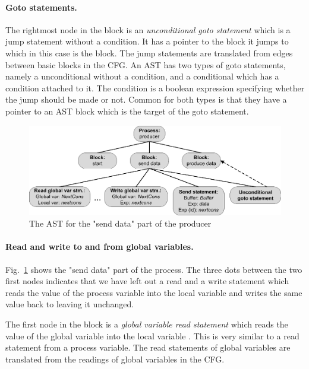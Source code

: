 \paragraph*{Goto statements.} The rightmost node in the  block is an \emph{unconditional goto statement} which is a jump statement without a condition. It has a pointer to the block it jumps to which in this case is the  block. The jump statements are translated from edges between basic blocks in the CFG. An AST has two types of goto statements, namely a unconditional without a condition, and a conditional which has a condition attached to it. The condition is a boolean expression specifying whether the jump should be made or not. Common for both types is that they have a pointer to an AST block which is the target of the goto statement.

\begin{figure}[b!]
\centering
\includegraphics[scale=0.7]{translation/cfg_to_ast/graphics/producersendast.eps}
\caption{The AST for the "send data" part of the producer}
\label{fig:producersendast}
\end{figure}

\paragraph*{Read and write to and from global variables.}
Fig.~\ref{fig:producersendast} shows the "send data" part of the  process. The three dots between the two first nodes indicates that we have left out a read and a write statement which reads the value of the process variable  into the local variable  and writes the same value back to  leaving it unchanged.

The first node in the  block is a \emph{global variable read statement} which reads the value of the global variable  into the local variable . This is very similar to a read statement from a process variable. The read statements of global variables are translated from the readings of global variables in the CFG.

